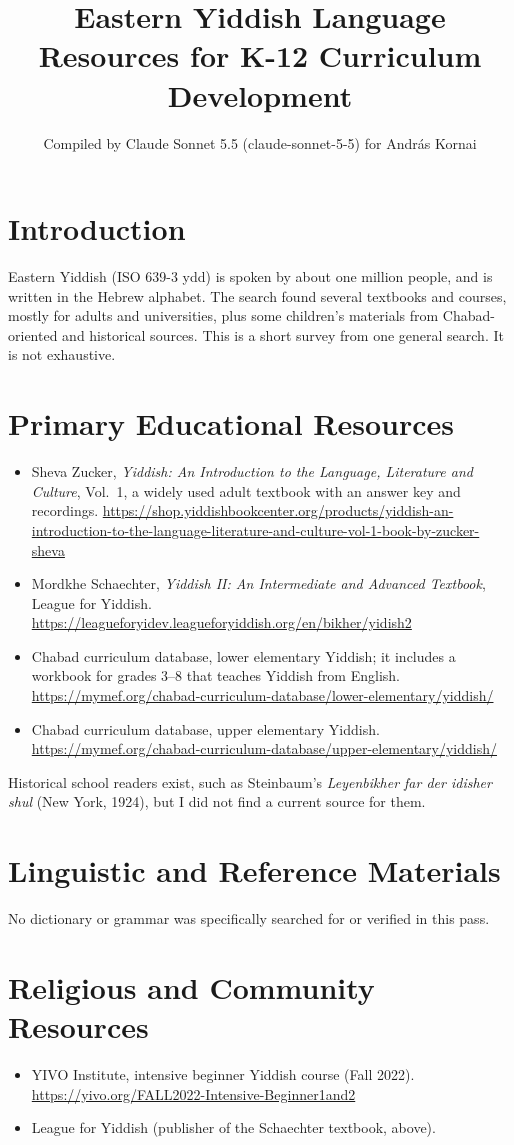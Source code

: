 \documentclass[12pt]{article}
\title{Eastern Yiddish Language Resources for K-12 Curriculum Development}
\author{Compiled by Claude Sonnet 5.5 (claude-sonnet-5-5) for Andr\'as Kornai}
\date{}
\begin{document}
\maketitle

\section{Introduction}
Eastern Yiddish (ISO 639-3 ydd) is spoken by about one million people, and is written in the Hebrew alphabet. The search found several textbooks and courses, mostly for adults and universities, plus some children's materials from Chabad-oriented and historical sources. This is a short survey from one general search. It is not exhaustive.

\section{Primary Educational Resources}
\begin{itemize}
\item Sheva Zucker, \emph{Yiddish: An Introduction to the Language, Literature and Culture}, Vol.\ 1, a widely used adult textbook with an answer key and recordings. \url{https://shop.yiddishbookcenter.org/products/yiddish-an-introduction-to-the-language-literature-and-culture-vol-1-book-by-zucker-sheva}
\item Mordkhe Schaechter, \emph{Yiddish II: An Intermediate and Advanced Textbook}, League for Yiddish. \url{https://leagueforyidev.leagueforyiddish.org/en/bikher/yidish2}
\item Chabad curriculum database, lower elementary Yiddish; it includes a workbook for grades 3--8 that teaches Yiddish from English. \url{https://mymef.org/chabad-curriculum-database/lower-elementary/yiddish/}
\item Chabad curriculum database, upper elementary Yiddish. \url{https://mymef.org/chabad-curriculum-database/upper-elementary/yiddish/}
\end{itemize}
Historical school readers exist, such as Steinbaum's \emph{Leyenbikher far der idisher shul} (New York, 1924), but I did not find a current source for them.

\section{Linguistic and Reference Materials}
No dictionary or grammar was specifically searched for or verified in this pass.

\section{Religious and Community Resources}
\begin{itemize}
\item YIVO Institute, intensive beginner Yiddish course (Fall 2022). \url{https://yivo.org/FALL2022-Intensive-Beginner1and2}
\item League for Yiddish (publisher of the Schaechter textbook, above).
\end{itemize}
\end{document}
